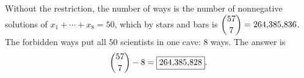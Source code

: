 Without the restriction, the number of ways is the number of nonnegative solutions of $x_1+\cdots+x_8=50$, which by stars and bars is $\dbinom{57}{7}=264{,}385{,}836$. The forbidden ways put all $50$ scientists in one cave: $8$ ways. The answer is
\[
\dbinom{57}{7}-8=\boxed{264{,}385{,}828} .
\]
